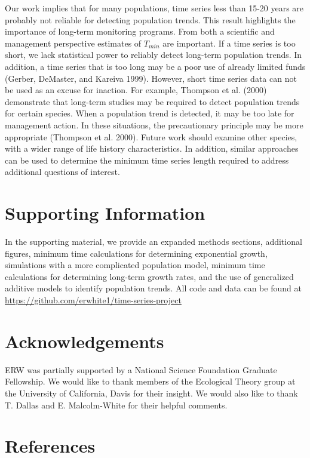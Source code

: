 \documentclass[12pt,]{article}
\begin{document}
Our work implies that for many populations, time series less than 15-20
years are probably not reliable for detecting population trends. This
result highlights the importance of long-term monitoring programs. From
both a scientific and management perspective estimates of \(T_{min}\)
are important. If a time series is too short, we lack statistical power
to reliably detect long-term population trends. In addition, a time
series that is too long may be a poor use of already limited funds
(Gerber, DeMaster, and Kareiva 1999). However, short time series data
can not be used as an excuse for inaction. For example, Thompson et al.
(2000) demonstrate that long-term studies may be required to detect
population trends for certain species. When a population trend is
detected, it may be too late for management action. In these situations,
the precautionary principle may be more appropriate (Thompson et al.
2000). Future work should examine other species, with a wider range of
life history characteristics. In addition, similar approaches can be
used to determine the minimum time series length required to address
additional questions of interest.

\section{Supporting Information}\label{supporting-information}

In the supporting material, we provide an expanded methods sections,
additional figures, minimum time calculations for determining
exponential growth, simulations with a more complicated population
model, minimum time calculations for determining long-term growth rates,
and the use of generalized additive models to identify population
trends. All code and data can be found at
\url{https://github.com/erwhite1/time-series-project}

\section{Acknowledgements}\label{acknowledgements}

ERW was partially supported by a National Science Foundation Graduate
Fellowship. We would like to thank members of the Ecological Theory
group at the University of California, Davis for their insight. We would
also like to thank T. Dallas and E. Malcolm-White for their helpful
comments.

\section{References}\label{references}
\end{document}
